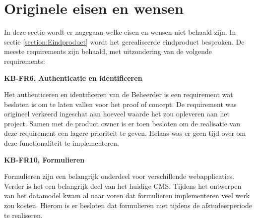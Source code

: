 \section{Originele eisen en wensen}
In deze sectie wordt er nagegaan welke eisen en wensen niet behaald zijn.
In sectie \ref{section:Eindproduct} wordt het gerealiseerde eindproduct besproken.
De meeste requirements zijn behaald, met uitzondering van de volgende requirements:

\whitespace
\textbf{KB-FR6, Authenticatie en identificeren}

\whitespace
Het authenticeren en identificeren van de \gls{Beheerder} is een requirement wat besloten is om te laten vallen voor het proof of concept.
De requirement was origineel verkeerd ingeschat aan hoeveel waarde het zou opleveren aan het project.
Samen met de product owner is er toen besloten om de realisatie van deze requirement een lagere prioriteit te geven.
Helaas was er geen tijd over om deze functionaliteit te implementeren.

\whitespace
\textbf{KB-FR10, Formulieren}

\whitespace
Formulieren zijn een belangrijk onderdeel voor verschillende webapplicaties.
Verder is het een belangrijk deel van het huidige \gls{CMS}.
Tijdens het ontwerpen van het datamodel kwam al naar voren dat formulieren implementeren veel werk zou kosten.
Hierom is er besloten dat formulieren niet tijdens de afstudeerperiode te realiseren.
